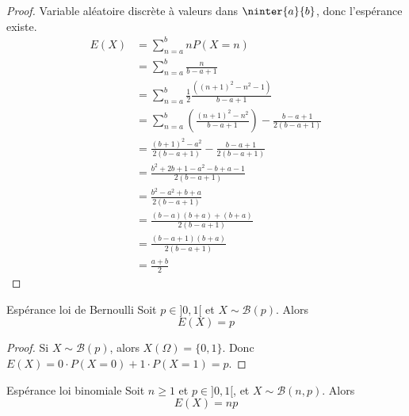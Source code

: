\begin{proof}
    Variable aléatoire discrète à valeurs dans $\ninter{a}{b}$, donc l'espérance existe. 
    \begin{align}
        E(X) & = \sum_{n = a}^b n P(X = n) \\
        & = \sum_{n = a}^b \frac n {b - a + 1} \\
        & = \sum_{n = a }^{b } \frac 1 2 \frac{((n + 1)^2 - n^2 - 1)}{b - a + 1} \\
        & = \sum_{n = a }^{b } \left( \frac {(n + 1)^2 - n^2}{b - a + 1} \right) - \frac {b - a + 1} {2 (b - a + 1)} \\
        & = \frac{(b + 1)^2 - a^2}{2 (b - a + 1)} - \frac{b - a + 1}{2 (b - a + 1)} \\
        & = \frac{b^2 + 2b + 1 - a^2 - b + a - 1}{2 (b - a + 1)} \\
        & = \frac{b^2 - a^2 + b + a}{2 (b - a + 1)} \\
        & = \frac{(b - a)(b + a) + (b + a)}{2 ( b - a + 1)} \\
        & = \frac{(b - a + 1)(b + a)}{2 (b - a + 1)} \\
        & = \frac{a + b}{2}
    \end{align}

\end{proof}

\begin{proposition}{Espérance loi de Bernoulli}{}
    Soit $p \in ]0, 1[$ et $X \sim \mathcal B(p)$. Alors 
    $$ E(X) = p $$
\end{proposition}

\begin{proof}
    Si $X \sim \mathcal B(p)$, alors $X(\Omega) = \{0, 1\}$.
    Donc $E(X) = 0 \cdot P(X = 0) + 1 \cdot P(X = 1) = p$.
\end{proof}

\begin{proposition}{Espérance loi binomiale}{}
    Soit $n \geqslant 1$ et $p \in ]0, 1[$, et $X \sim \mathcal B(n, p)$. Alors 
    $$ E(X) = n p $$
\end{proposition}

